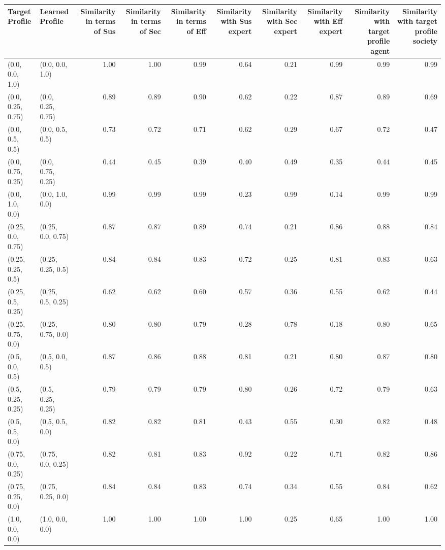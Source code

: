 \begin{tabular}{llrrrrrrrr}
\toprule
Target Profile & Learned Profile & Similarity in terms of Sus & Similarity in terms of Sec & Similarity in terms of Eff & Similarity with Sus expert & Similarity with Sec expert & Similarity with Eff expert & Similarity with target profile agent & Similarity with target profile society \\
\midrule
(0.0, 0.0, 1.0) & (0.0, 0.0, 1.0) & 1.00 & 1.00 & 0.99 & 0.64 & 0.21 & 0.99 & 0.99 & 0.99 \\
(0.0, 0.25, 0.75) & (0.0, 0.25, 0.75) & 0.89 & 0.89 & 0.90 & 0.62 & 0.22 & 0.87 & 0.89 & 0.69 \\
(0.0, 0.5, 0.5) & (0.0, 0.5, 0.5) & 0.73 & 0.72 & 0.71 & 0.62 & 0.29 & 0.67 & 0.72 & 0.47 \\
(0.0, 0.75, 0.25) & (0.0, 0.75, 0.25) & 0.44 & 0.45 & 0.39 & 0.40 & 0.49 & 0.35 & 0.44 & 0.45 \\
(0.0, 1.0, 0.0) & (0.0, 1.0, 0.0) & 0.99 & 0.99 & 0.99 & 0.23 & 0.99 & 0.14 & 0.99 & 0.99 \\
(0.25, 0.0, 0.75) & (0.25, 0.0, 0.75) & 0.87 & 0.87 & 0.89 & 0.74 & 0.21 & 0.86 & 0.88 & 0.84 \\
(0.25, 0.25, 0.5) & (0.25, 0.25, 0.5) & 0.84 & 0.84 & 0.83 & 0.72 & 0.25 & 0.81 & 0.83 & 0.63 \\
(0.25, 0.5, 0.25) & (0.25, 0.5, 0.25) & 0.62 & 0.62 & 0.60 & 0.57 & 0.36 & 0.55 & 0.62 & 0.44 \\
(0.25, 0.75, 0.0) & (0.25, 0.75, 0.0) & 0.80 & 0.80 & 0.79 & 0.28 & 0.78 & 0.18 & 0.80 & 0.65 \\
(0.5, 0.0, 0.5) & (0.5, 0.0, 0.5) & 0.87 & 0.86 & 0.88 & 0.81 & 0.21 & 0.80 & 0.87 & 0.80 \\
(0.5, 0.25, 0.25) & (0.5, 0.25, 0.25) & 0.79 & 0.79 & 0.79 & 0.80 & 0.26 & 0.72 & 0.79 & 0.63 \\
(0.5, 0.5, 0.0) & (0.5, 0.5, 0.0) & 0.82 & 0.82 & 0.81 & 0.43 & 0.55 & 0.30 & 0.82 & 0.48 \\
(0.75, 0.0, 0.25) & (0.75, 0.0, 0.25) & 0.82 & 0.81 & 0.83 & 0.92 & 0.22 & 0.71 & 0.82 & 0.86 \\
(0.75, 0.25, 0.0) & (0.75, 0.25, 0.0) & 0.84 & 0.84 & 0.83 & 0.74 & 0.34 & 0.55 & 0.84 & 0.62 \\
(1.0, 0.0, 0.0) & (1.0, 0.0, 0.0) & 1.00 & 1.00 & 1.00 & 1.00 & 0.25 & 0.65 & 1.00 & 1.00 \\
\bottomrule
\end{tabular}
